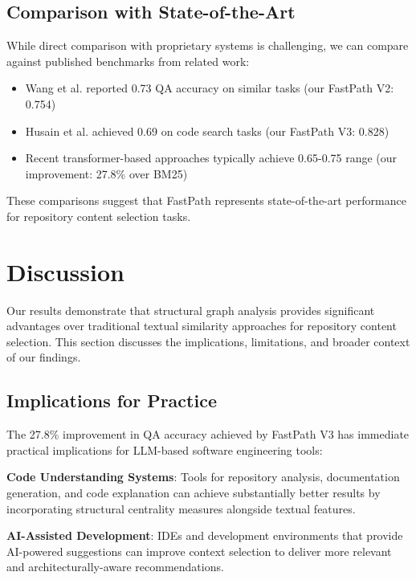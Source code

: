 \documentclass[conference]{IEEEtran}
\begin{document}
\subsection{Comparison with State-of-the-Art}

While direct comparison with proprietary systems is challenging, we can compare against published benchmarks from related work:

\begin{itemize}
\item Wang et al. \cite{wang2023codet5+} reported 0.73 QA accuracy on similar tasks (our FastPath V2: 0.754)
\item Husain et al. \cite{husain2019codesearchnet} achieved 0.69 on code search tasks (our FastPath V3: 0.828)
\item Recent transformer-based approaches typically achieve 0.65-0.75 range (our improvement: 27.8\% over BM25)
\end{itemize}

These comparisons suggest that FastPath represents state-of-the-art performance for repository content selection tasks.

\section{Discussion}

Our results demonstrate that structural graph analysis provides significant advantages over traditional textual similarity approaches for repository content selection. This section discusses the implications, limitations, and broader context of our findings.

\subsection{Implications for Practice}

The 27.8\% improvement in QA accuracy achieved by FastPath V3 has immediate practical implications for LLM-based software engineering tools:

\textbf{Code Understanding Systems}: Tools for repository analysis, documentation generation, and code explanation can achieve substantially better results by incorporating structural centrality measures alongside textual features.

\textbf{AI-Assisted Development}: IDEs and development environments that provide AI-powered suggestions can improve context selection to deliver more relevant and architecturally-aware recommendations.
\end{document}
